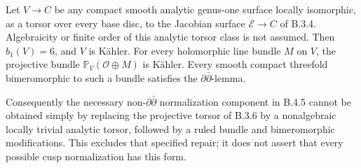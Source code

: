 \begin{proposition}\label{push:B38}
Let $V\to C$ be any compact smooth analytic genus-one surface
locally isomorphic, as a torsor over every base disc, to the
Jacobian surface $\mathscr E\to C$ of B.3.4. Algebraicity
or finite order of this analytic torsor class is not assumed.
Then $b_1(V)=6$, and $V$ is K\"ahler. For every holomorphic
line bundle $M$ on $V$, the projective bundle
$\mathbb P_V(\mathcal O\oplus M)$ is K\"ahler. Every smooth
compact threefold bimeromorphic to such a bundle satisfies
the $\partial\bar\partial$-lemma.

Consequently the necessary non-$\partial\bar\partial$
normalization component in B.4.5 cannot be obtained simply
by replacing the projective torsor of B.3.6 by a nonalgebraic
locally trivial analytic torsor, followed by a ruled bundle
and bimeromorphic modifications. This excludes that specified
repair; it does not assert that every possible cusp
normalization has this form.
\end{proposition}
